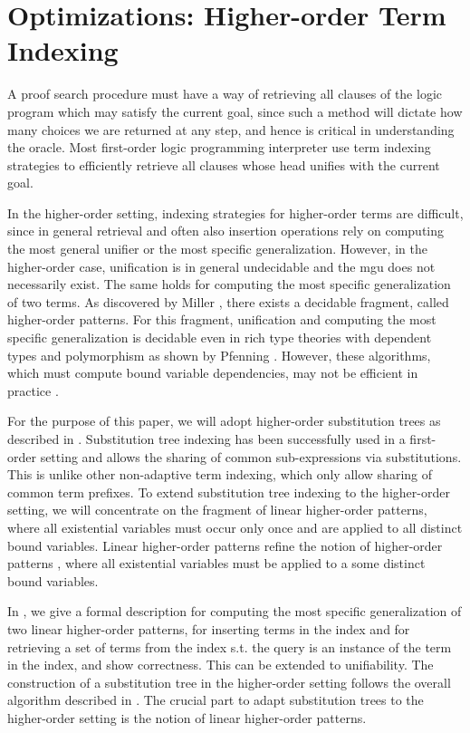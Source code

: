 \documentclass{acmconf}
\begin{document}
\section{Optimizations: Higher-order Term Indexing}

A proof search procedure must have a way of retrieving all clauses of
the logic program which may satisfy the current goal, since such a
method will dictate how many choices we are returned at any step, and
hence is critical in understanding the oracle. Most first-order logic
programming interpreter use term indexing strategies to efficiently
retrieve all clauses whose head unifies with the current goal.

In the higher-order setting, indexing strategies for higher-order
terms are difficult, since in general retrieval and often also
insertion operations rely on computing the most general unifier or the
most specific generalization. However, in the higher-order case,
unification is in general undecidable and the mgu does not necessarily
exist. The same holds for computing the most specific generalization
of two terms. As discovered by Miller \cite{Miller91iclp}, there exists a decidable
fragment, called higher-order patterns. For this fragment, unification
and computing the most specific generalization is decidable even in
rich type theories with dependent types and polymorphism as shown by
Pfenning \cite{Pfenning91lics}.  However, these algorithms, which must
compute bound variable dependencies, may not be efficient in practice
\cite{PientkaPfenning:CADE03}.  

For the purpose of this paper, we will adopt higher-order substitution
trees as described in \cite{Pientka:ICLP03}. Substitution tree
indexing has been successfully used in a first-order setting \cite{Graf+Book95} and
allows the sharing of common sub-expressions via substitutions. This
is unlike other non-adaptive term indexing, which only allow sharing
of common term prefixes. To extend substitution tree indexing to the
higher-order setting, we will concentrate on the fragment of linear
higher-order patterns, where all existential variables must occur only
once and are applied to all distinct bound variables. Linear
higher-order patterns refine the notion of higher-order patterns
\cite{Miller91iclp}, where all existential variables must be applied
to a some distinct bound variables. 

 In \cite{Pientka:ICLP03,Pientka03phd}, we give a formal 
description for computing the most specific generalization of two
linear higher-order patterns, for inserting terms in the index and for
retrieving a set of terms from the index s.t. the query is an instance
of the term in the index, and show correctness. This can be extended
to unifiability. The construction of a substitution tree in the higher-order setting
follows the overall algorithm described in
\cite{Ramakrishnan01:indexing}. The crucial part to adapt substitution
trees to the higher-order setting is the notion of linear higher-order
patterns.
\end{document}

